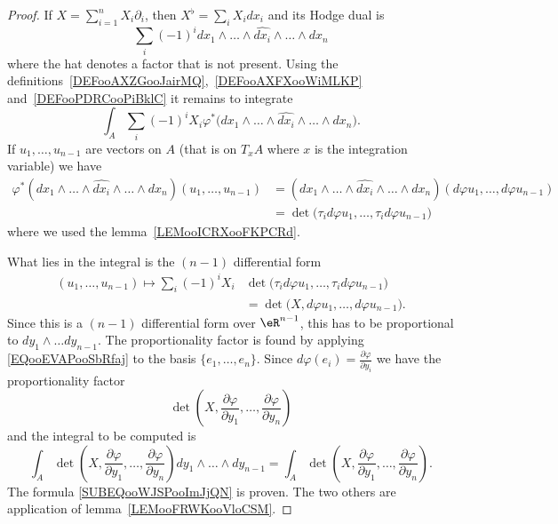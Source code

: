 \begin{proof}
	If \( X=\sum_{i=1}^nX_i\partial_i\), then \( X^{\flat}=\sum_{i}X_idx_i\) and its Hodge dual is
	\begin{equation}
		\sum_{i}(-1)^i dx_1\wedge\ldots\wedge\widehat{dx_i}\wedge\ldots\wedge dx_n
	\end{equation}
	where the hat denotes a factor that is not present. Using the definitions~\ref{DEFooAXZGooJairMQ},~\ref{DEFooAXFXooWiMLKP} and~\ref{DEFooPDRCooPiBklC} it remains to integrate
	\begin{equation}
		\int_A\sum_i(-1)^iX_i\varphi^*\big( dx_1\wedge\ldots\wedge\widehat{dx_i}\wedge\ldots\wedge dx_n \big).
	\end{equation}
	If \( u_1,\ldots, u_{n-1}\) are vectors on \( A\) (that is on \( T_xA\) where \( x\) is the integration variable) we have
	\begin{subequations}
		\begin{align}
			\varphi^*(dx_1\wedge\ldots\wedge \widehat{dx_i}\wedge\ldots\wedge dx_n)(u_1,\ldots, u_{n-1}) & = (dx_1\wedge\ldots\wedge \widehat{dx_i}\wedge\ldots\wedge dx_n)(d\varphi u_1,\ldots, d\varphi u_{n-1}) \\
			                                                                                             & =\det\big( \tau_id\varphi u_1,\ldots, \tau_id\varphi u_{n-1} \big)
		\end{align}
	\end{subequations}
	where we used the lemma~\ref{LEMooICRXooFKPCRd}.

	What lies in the integral is the \( (n-1)\) differential form
	\begin{subequations}        \label{EQooEVAPooSbRfaj}
		\begin{align}
			(u_1,\ldots, u_{n-1})\mapsto \sum_{i}(-1)^iX_i & \det\big(    \tau_id\varphi u_1,\ldots, \tau_id\varphi u_{n-1}  \big) \\
			                                               & =\det\big( X,d\varphi u_1,\ldots, d\varphi u_{n-1} \big).
		\end{align}
	\end{subequations}
	Since this is a \( (n-1)\) differential form over \( \eR^{n-1}\), this has to be proportional to \( dy_1\wedge\ldots dy_{n-1}\). The proportionality factor is found by applying \eqref{EQooEVAPooSbRfaj} to the basis \( \{ e_1,\ldots, e_n \}\). Since \( d\varphi(e_i)=\frac{ \partial \varphi }{ \partial y_i }\) we have the proportionality factor
	\begin{equation}
		\det\left( X,\frac{ \partial \varphi }{ \partial y_1 },\ldots, \frac{ \partial \varphi }{ \partial y_n } \right)
	\end{equation}
	and the integral to be computed is
	\begin{equation}
		\int_A\det\left( X,\frac{ \partial \varphi }{ \partial y_1 },\ldots, \frac{ \partial \varphi }{ \partial y_n } \right)dy_1\wedge\ldots\wedge dy_{n-1}=\int_A\det\left( X,\frac{ \partial \varphi }{ \partial y_1 },\ldots, \frac{ \partial \varphi }{ \partial y_n } \right).
	\end{equation}
	The formula \eqref{SUBEQooWJSPooImJjQN} is proven. The two others are application of lemma~\ref{LEMooFRWKooVloCSM}.
\end{proof}
